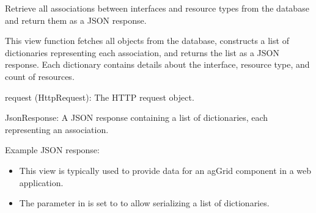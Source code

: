 \documentclass[letterpaper,10pt,english]{sphinxmanual}
\begin{document}

\begin{fulllineitems}
\label{\detokenize{app:app.views.get_associations}}
\pysigstartsignatures
{}
\pysigstopsignatures
\sphinxAtStartPar
Retrieve all associations between interfaces and resource types from the database and return them as a JSON response.

\sphinxAtStartPar
This view function fetches all  objects from the database, constructs a list 
of dictionaries representing each association, and returns the list as a JSON response. 
Each dictionary contains details about the interface, resource type, and count of resources.
\begin{description}
\sphinxAtStartPar
request (HttpRequest): The HTTP request object.

\sphinxAtStartPar
JsonResponse: A JSON response containing a list of dictionaries, each representing an association.

\sphinxAtStartPar
Example JSON response:

\begin{sphinxVerbatim}[commandchars=\\\{\}]
\PYG{p}{[}
\PYG{p}{]}
\end{sphinxVerbatim}

\begin{itemize}
\item {} 
\sphinxAtStartPar
This view is typically used to provide data for an ag\sphinxhyphen{}Grid component in a web application.

\item {} 
\sphinxAtStartPar
The  parameter in  is set to  to allow serializing a list of dictionaries.

\end{itemize}

\end{description}

\end{fulllineitems}
\end{document}
